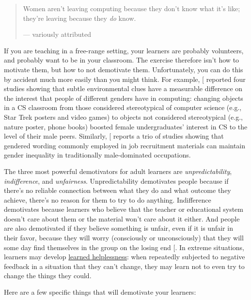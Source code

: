 \begin{quote}\setlength{\parindent}{0pt}
Women aren't leaving computing because they don't know what it's like;
they're leaving because they \emph{do} know.

--- variously attributed
\end{quote}

If you are teaching in a free-range setting, your learners are probably
volunteers, and probably want to be in your classroom. The exercise
therefore isn't how to motivate them, but how to not demotivate them.
Unfortunately, you can do this by accident much more easily than you
might think. For example, {[}\protect[\hyperlink{b:Cher2009}{Cher2009}]{]} reported four studies
showing that subtle environmental clues have a measurable difference on
the interest that people of different genders have in computing:
changing objects in a CS classroom from those considered stereotypical
of computer science (e.g., Star Trek posters and video games) to objects
not considered stereotypical (e.g., nature poster, phone books) boosted
female undergraduates' interest in CS to the level of their male peers.
Similarly, {[}\protect[\hyperlink{b:Gauc2011}{Gauc2011}]{]} reports a trio of studies showing that
gendered wording commonly employed in job recruitment materials can
maintain gender inequality in traditionally male-dominated occupations.

The three most powerful demotivators for adult learners are
\emph{unpredictability}, \emph{indifference}, and \emph{unfairness}. Unpredictability
demotivates people because if there's no reliable connection between
what they do and what outcome they achieve, there's no reason for them
to try to do anything. Indifference demotivates because learners who
believe that the teacher or educational system doesn't care about them
or the material won't care about it either. And people are also
demotivated if they believe something is unfair, even if it is unfair in
their favor, because they will worry (consciously or unconsciously) that
they will some day find themselves in the group on the losing end
{[}\protect[\hyperlink{b:Wilk2011}{Wilk2011}]{]}. In extreme situations, learners may develop
\protect\hyperlink{g:learned-helplessness}{learned helplessness}: when
repeatedly subjected to negative feedback in a situation that they can't
change, they may learn not to even try to change the things they could.

Here are a few specific things that will demotivate your learners:

